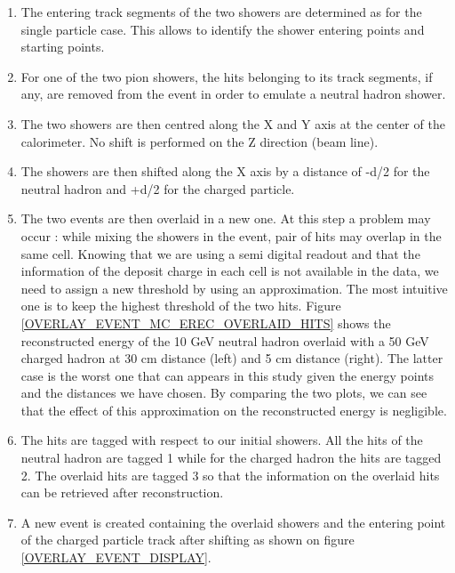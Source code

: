 \documentclass[cits]{JINST}
\begin{document}
\begin{enumerate}
  \item The entering track segments of the two showers are determined as for the single particle case. This allows to identify the shower entering points and starting points.
  \item For one of the two pion showers, the hits belonging to its track segments, if any, are removed from the event in order to emulate a neutral hadron shower.
  \item The two showers are then centred along the X and Y axis at the center of the calorimeter. No shift is performed on the Z direction (beam line).
  \item The showers are then shifted along the X axis by a distance of -d/2 for the neutral hadron and +d/2 for the charged particle.
  \item The two events are then overlaid in a new one. At this step a problem may occur : while mixing the showers in the event, pair of hits may overlap in the same cell. Knowing that we are using a semi digital readout and that the information of the deposit charge in each cell is not available in the data, we need to assign a new threshold by using an approximation. The most intuitive one is to keep the highest threshold of the two hits. Figure \ref{OVERLAY_EVENT_MC_EREC_OVERLAID_HITS} shows the reconstructed energy of the 10 GeV neutral hadron overlaid with a 50 GeV charged hadron at 30 cm distance (left) and 5 cm distance (right). The latter case is the worst one that can appears in this study given the energy points and the distances we have chosen. By comparing the two plots, we can see that the effect of this approximation on the reconstructed energy is negligible.
  \item The hits are tagged with respect to our initial showers. All the hits of the neutral hadron are tagged 1 while for the charged hadron the hits are tagged 2. The overlaid hits are tagged 3 so that the information on the overlaid hits can be retrieved after reconstruction.
  \item A new event is created containing the overlaid showers and the entering point of the charged particle track after shifting as shown on figure \ref{OVERLAY_EVENT_DISPLAY}.
\end{enumerate}
\end{document}
